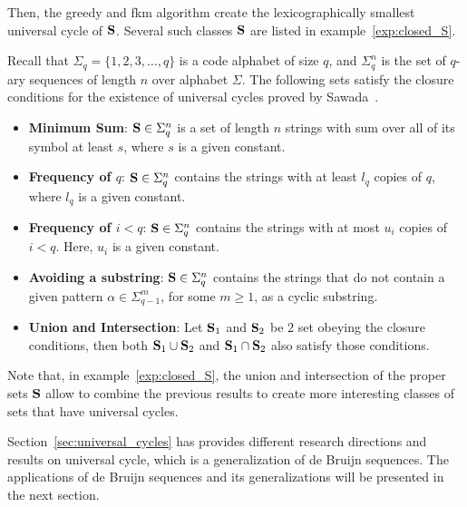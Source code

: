 Then, the greedy and \gls{fkm} algorithm create the lexicographically smallest universal cycle of ${\mathbf S}$. Several such classes ${\mathbf S}$ are listed in example~\ref{exp:closed_S}.

\begin{example}\label{exp:closed_S}
Recall that $\Sigma_{q}=\{1,2,3,\ldots,q\}$ is a code alphabet of size $q$, and $\Sigma_{q}^{n}$ is the set of $q$-ary sequences of length $n$ over alphabet $\Sigma$. The following sets satisfy the closure conditions for the existence of universal cycles proved by Sawada~\cite{sawada2016generalizing}.
\begin{itemize}
    \item \textbf{Minimum Sum}: ${\mathbf S}\in\Sigma_{q}^{n}$ is a set of length $n$ strings with sum over all of its symbol at least $s$, where $s$ is a given constant.
    \item \textbf{Frequency of $q$}: ${\mathbf S}\in\Sigma_{q}^{n}$ contains the strings with at least $l_{q}$ copies of $q$, where $l_{q}$ is a given constant.
    \item \textbf{Frequency of $i<q$}: ${\mathbf S}\in\Sigma_{q}^{n}$ contains the strings with at most $u_{i}$ copies of $i<q$. Here, $u_{i}$ is a given constant.
    \item \textbf{Avoiding a substring}: ${\mathbf S}\in\Sigma_{q}^{n}$ contains the strings that do not contain a given pattern $\alpha\in\Sigma_{q-1}^{m}$, for some $m\geq1$, as a cyclic substring. 
    \item \textbf{Union and Intersection}: Let ${\mathbf S}_{1}$ and ${\mathbf S}_{2}$ be $2$ set obeying the closure conditions, then both ${\mathbf S}_{1}\cup {\mathbf S}_{2}$ and ${\mathbf S}_{1}\cap {\mathbf S}_{2}$ also satisfy those conditions.
\end{itemize}
\end{example}
Note that, in example~\ref{exp:closed_S}, the union and intersection of the proper sets ${\mathbf S}$ allow to combine the previous results to create more interesting classes of sets that have universal cycles. 

Section~\ref{sec:universal_cycles} has provides different research directions and results on universal cycle, which is a generalization of de Bruijn sequences. The applications of de Bruijn sequences and its generalizations will be presented in the next section. 

